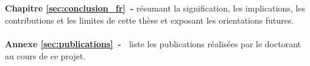 \\
\\
\textbf{Chapitre \ref{sec:conclusion_fr}~-} résumant la signification, les implications, les contributions et les limites de cette thèse et exposant les orientations futures.
\\
\\
\textbf{Annexe \ref{sec:publications}~-~} liste les publications réalisées par le doctorant au cours de ce projet.